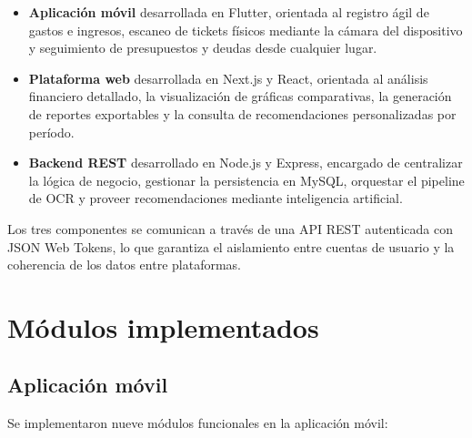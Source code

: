 \begin{itemize}
  \item \textbf{Aplicación móvil} desarrollada en Flutter, orientada al
    registro ágil de gastos e ingresos, escaneo de tickets físicos
    mediante la cámara del dispositivo y seguimiento de presupuestos y
    deudas desde cualquier lugar.

  \item \textbf{Plataforma web} desarrollada en Next.js y React,
    orientada al análisis financiero detallado, la visualización de
    gráficas comparativas, la generación de reportes exportables y la
    consulta de recomendaciones personalizadas por período.

  \item \textbf{Backend REST} desarrollado en Node.js y Express,
    encargado de centralizar la lógica de negocio, gestionar la
    persistencia en MySQL, orquestar el pipeline de OCR y proveer
    recomendaciones mediante inteligencia artificial.
\end{itemize}

Los tres componentes se comunican a través de una API REST autenticada
con JSON Web Tokens, lo que garantiza el aislamiento entre cuentas de
usuario y la coherencia de los datos entre plataformas.

\section{Módulos implementados}

\subsection{Aplicación móvil}

Se implementaron nueve módulos funcionales en la aplicación móvil:

